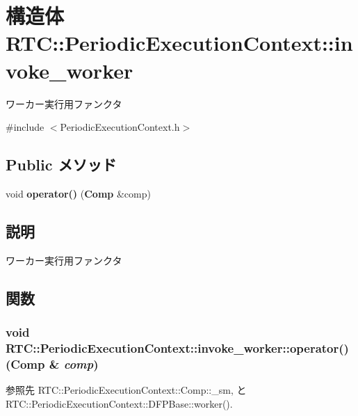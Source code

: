 \section{構造体 RTC::PeriodicExecutionContext::invoke\_\-worker}
\label{structRTC_1_1PeriodicExecutionContext_1_1invoke__worker}


ワーカー実行用ファンクタ  




{\ttfamily \#include $<$PeriodicExecutionContext.h$>$}

\subsection*{Public メソッド}
\begin{DoxyCompactItemize}
\item 
void {\bf operator()} ({\bf Comp} \&comp)
\end{DoxyCompactItemize}


\subsection{説明}
ワーカー実行用ファンクタ 

\subsection{関数}
\subsubsection[{operator()}]{\setlength{\rightskip}{0pt plus 5cm}void RTC::PeriodicExecutionContext::invoke\_\-worker::operator() ({\bf Comp} \& {\em comp})\hspace{0.3cm}{\ttfamily  [inline]}}\label{structRTC_1_1PeriodicExecutionContext_1_1invoke__worker_ab7b7faf3e55941e7829e36d1a86cc211}


参照先 RTC::PeriodicExecutionContext::Comp::\_\-sm, と RTC::PeriodicExecutionContext::DFPBase::worker().

